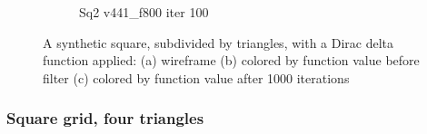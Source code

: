 \begin{figure}[ht]
{\begin{subfigure}[b]{0.48\linewidth}
		\caption{Sq2 v441\_f800 iter 100}\label{fig:sq2.f}
	\end{subfigure}}
	{\caption[Synthetic Square, 2 triangles, Dirac delta function]{A synthetic square, subdivided by triangles, with a Dirac delta function applied: (a) wireframe (b) colored by function value before filter (c) colored by function value after 1000 iterations
	}\label{fig:sq2}}
\end{figure}
\todoCitation
{}

\subsubsection{Square grid, four triangles}

